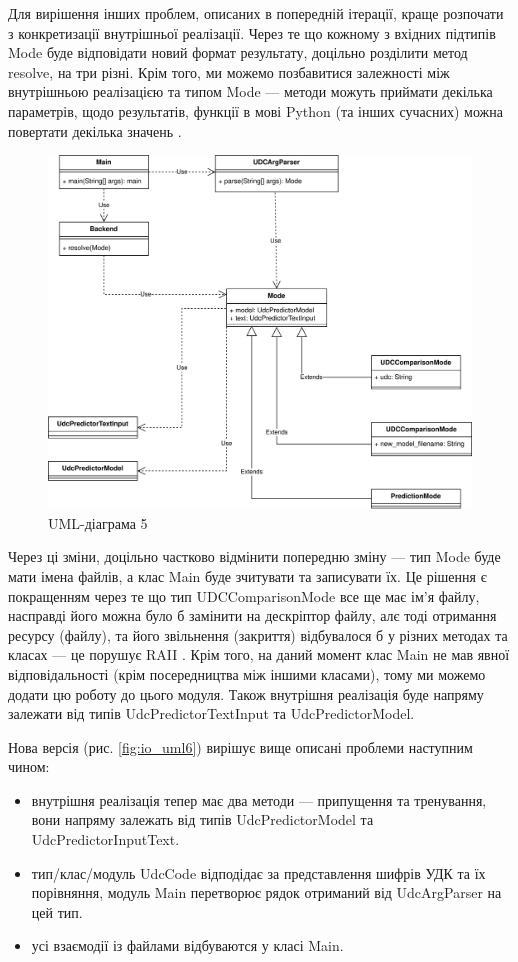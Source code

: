 \documentclass[14pt]{extarticle}
\begin{document}
  Для вирішення інших проблем, описаних в попередній ітерації,
  краще розпочати з конкретизації внутрішньої реалізації.
  Через те що кожному з вхідних підтипів Mode буде відповідати новий формат
  результату, доцільно розділити метод resolve, на три різні.
  Крім того, ми можемо позбавитися залежності між
  внутрішньою реалізацією та типом Mode ---
  методи можуть приймати декілька параметрів,
  щодо результатів, функції в мові Python (та інших сучасних)
  можна повертати декілька значень
  \cite{python3_tuples_and_sequences}.

  \begin{figure}
    \centering
    \includegraphics[height=0.6\textwidth]{io_uml5.drawio.png}    
    \caption{UML-діаграма 5}
    \label{fig:io_uml5}
  \end{figure}

  Через ці зміни, доцільно частково відмінити попередню зміну ---
  тип Mode буде мати імена файлів, а клас Main буде зчитувати та записувати їх.
  Це рішення є покращенням через те що тип
  UDCComparisonMode все ще має ім'я файлу,
  насправді його можна було б замінити на дескріптор файлу,
  алє тоді отримання ресурсу (файлу),
  та його звільнення (закриття) відбувалося б у різних методах та класах ---
  це порушує RAII \cite{wiki_raii}.
  Крім того, на даний момент клас Main не мав явної відповідальності
  (крім посередництва між іншими класами),
  тому ми можемо додати цю роботу до цього модуля.
  Також внутрішня реалізація буде напряму залежати
  від типів UdcPredictorTextInput та UdcPredictorModel.

  Нова версія (рис. \ref{fig:io_uml6}) вирішує вище описані проблеми
  наступним чином:
  \begin{itemize}[labelindent=\dimexpr{}\relax, leftmargin=*]
    \item внутрішня реалізація тепер має два методи ---
    припущення та тренування,
    вони напряму залежать від типів UdcPredictorModel та \\ UdcPredictorInputText.
    \item тип/клас/модуль UdcCode відподідає за представлення шифрів УДК
    та їх порівняння,
    модуль Main перетворює рядок отриманий від UdcArgParser на цей тип.
    \item усі взаємодії із файлами відбуваются у класі Main.
  \end{itemize}
\end{document}
